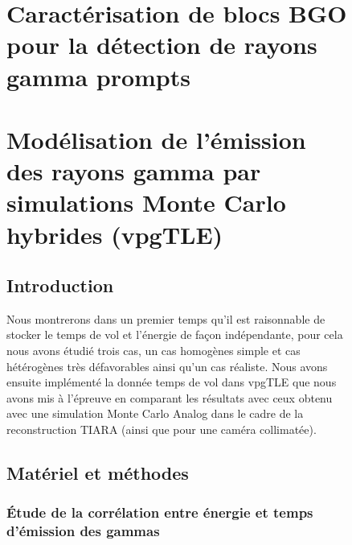 \documentclass[11pt,a4paper,oldfontcommands]{memoir}
\begin{document}
\begin{figure}
\openany
\chapter{Caractérisation de blocs BGO pour la détection de rayons gamma prompts}



\chapter{Modélisation de l'émission des rayons gamma par simulations Monte Carlo hybrides (vpgTLE)}

\section{Introduction}

 Nous montrerons dans un premier temps qu'il est raisonnable de stocker le temps de vol et l’énergie de façon indépendante, pour cela nous avons étudié trois cas, un cas homogènes simple et cas hétérogènes très défavorables ainsi qu'un cas réaliste. Nous avons ensuite implémenté la donnée temps de vol dans vpgTLE que nous avons mis à l'épreuve en comparant les résultats avec ceux obtenu avec une simulation Monte Carlo Analog dans le cadre de la reconstruction TIARA (ainsi que pour une caméra collimatée).

\section{Matériel et méthodes}

\subsection{\'Etude de la corrélation entre énergie et temps d'émission des gammas}


\end{figure}
\end{document}

